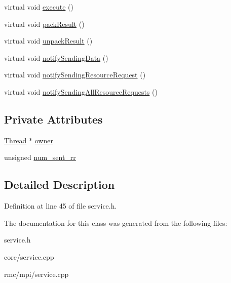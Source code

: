 \begin{CompactItemize}
\item 
\hypertarget{classService_e4f2894e6121e60f38d41cfbd7447ae4}{
virtual void \hyperlink{classService_e4f2894e6121e60f38d41cfbd7447ae4}{execute} ()}
\label{classService_e4f2894e6121e60f38d41cfbd7447ae4}

\item 
\hypertarget{classService_e5e4f90b2315e15c2a2913bd370f4cf5}{
virtual void \hyperlink{classService_e5e4f90b2315e15c2a2913bd370f4cf5}{pack\-Result} ()}
\label{classService_e5e4f90b2315e15c2a2913bd370f4cf5}

\item 
\hypertarget{classService_45c06344edbfa482b91f68e2035a6099}{
virtual void \hyperlink{classService_45c06344edbfa482b91f68e2035a6099}{unpack\-Result} ()}
\label{classService_45c06344edbfa482b91f68e2035a6099}

\item 
\hypertarget{classService_81ad4d6ebb50045b8977e2ab74826f30}{
virtual void \hyperlink{classService_81ad4d6ebb50045b8977e2ab74826f30}{notify\-Sending\-Data} ()}
\label{classService_81ad4d6ebb50045b8977e2ab74826f30}

\item 
\hypertarget{classService_94e2012e76aaae3aa8199250f558d503}{
virtual void \hyperlink{classService_94e2012e76aaae3aa8199250f558d503}{notify\-Sending\-Resource\-Request} ()}
\label{classService_94e2012e76aaae3aa8199250f558d503}

\item 
\hypertarget{classService_f94cc8a5c2665d4574041737e61e9ffc}{
virtual void \hyperlink{classService_f94cc8a5c2665d4574041737e61e9ffc}{notify\-Sending\-All\-Resource\-Requests} ()}
\label{classService_f94cc8a5c2665d4574041737e61e9ffc}

\end{CompactItemize}
\subsection*{Private Attributes}
\begin{CompactItemize}
\item 
\hypertarget{classService_8b615c65c876f342fe8209eb7e36d7b2}{
\hyperlink{classThread}{Thread} $\ast$ \hyperlink{classService_8b615c65c876f342fe8209eb7e36d7b2}{owner}}
\label{classService_8b615c65c876f342fe8209eb7e36d7b2}

\item 
\hypertarget{classService_a5b2ad9520bb3710b54348b99acebd58}{
unsigned \hyperlink{classService_a5b2ad9520bb3710b54348b99acebd58}{num\_\-sent\_\-rr}}
\label{classService_a5b2ad9520bb3710b54348b99acebd58}

\end{CompactItemize}


\subsection{Detailed Description}




Definition at line 45 of file service.h.

The documentation for this class was generated from the following files:\begin{CompactItemize}
\item 
service.h\item 
core/service.cpp\item 
rmc/mpi/service.cpp\end{CompactItemize}
